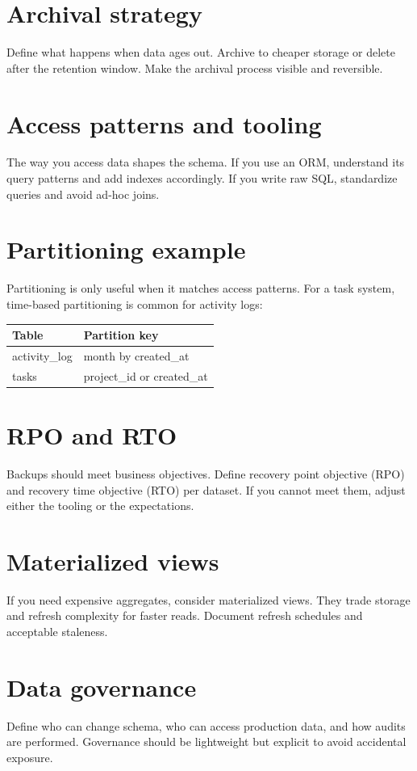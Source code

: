 \section{Archival strategy}
Define what happens when data ages out.
Archive to cheaper storage or delete after the retention window.
Make the archival process visible and reversible.

\section{Access patterns and tooling}
The way you access data shapes the schema.
If you use an ORM, understand its query patterns and add indexes accordingly.
If you write raw SQL, standardize queries and avoid ad-hoc joins.

\section{Partitioning example}
Partitioning is only useful when it matches access patterns.
For a task system, time-based partitioning is common for activity logs:

\begin{tabularx}{\textwidth}{@{}lX@{}}
\toprule
Table & Partition key \\
\midrule
activity\_log & month by created\_at \\
tasks & project\_id or created\_at \\
\bottomrule
\end{tabularx}

\section{RPO and RTO}
Backups should meet business objectives.
Define recovery point objective (RPO) and recovery time objective (RTO) per dataset.
If you cannot meet them, adjust either the tooling or the expectations.

\section{Materialized views}
If you need expensive aggregates, consider materialized views.
They trade storage and refresh complexity for faster reads.
Document refresh schedules and acceptable staleness.

\section{Data governance}
Define who can change schema, who can access production data, and how audits are performed.
Governance should be lightweight but explicit to avoid accidental exposure.

